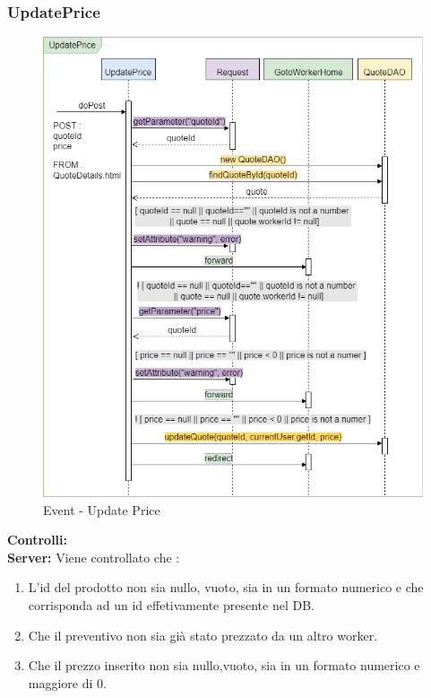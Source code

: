 \documentclass[a4paper, 12pt]{article}
\begin{document}
\subsubsection{UpdatePrice}
\begin{figure}[h!]
	\centering
	\includegraphics[width=1\textwidth]{PureHTML_images/UpdatePrice.png}
	\caption{Event - Update Price}
	\label{figure:updateprice_sd}
\end{figure}
\noindent \textbf{Controlli:}\\
\noindent \textbf{Server:} 
\noindent Viene controllato che :
\begin{enumerate}
\item L'id del prodotto non sia nullo, vuoto, sia in un formato numerico e che corrisponda ad un id effetivamente presente nel DB.
\item Che il preventivo non sia già stato prezzato da un altro worker.
\item Che il prezzo inserito non sia nullo,vuoto, sia in un formato numerico e maggiore di 0.
\end{enumerate}
\end{document}
